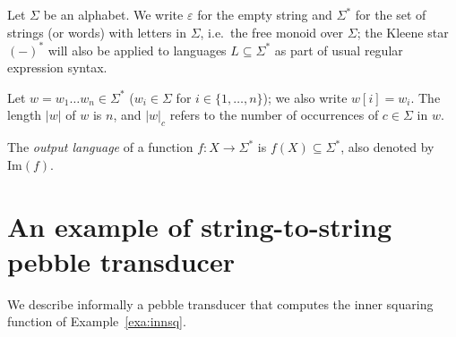 \documentclass{fundam}
\newcommand{\Image}{\mathrm{Im}}
\theoremstyle{claimstyle}
\begin{document}
Let $\Sigma$ be an alphabet. We write $\varepsilon$ for the empty string and $\Sigma^*$ for the set of strings (or words) with letters in $\Sigma$, i.e.\ the free monoid over $\Sigma$; the Kleene star $(-)^*$ will also be applied to languages $L \subseteq \Sigma^*$ as part of usual regular expression syntax. 

Let $w = w_1 \dots w_n \in \Sigma^*$ ($w_i \in \Sigma$ for $i\in\{1,\dots,n\}$);
we also write $w[i] = w_i$. The length $|w|$ of $w$ is $n$, and $|w|_c$ refers
to the number of occurrences of $c\in\Sigma$ in $w$.

The \emph{output language} of a function $f \colon X \to \Sigma^*$ is $f(X) \subseteq \Sigma^*$, also denoted by $\Image(f)$.


\section{An example of string-to-string pebble transducer}
\label{sec:innsq}

We describe informally a pebble transducer that computes the inner squaring
function of Example~\ref{exa:innsq}.
\end{document}
